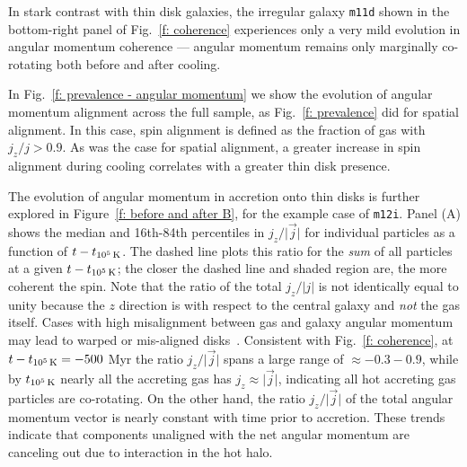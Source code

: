 \documentclass[fleqn,usenatbib]{mnras}
\newcommand{\tcon}{t_{10^5\,{\rm K}}}
\begin{document}
In stark contrast with thin disk galaxies, the irregular galaxy \texttt{m11d} shown in the bottom-right panel of Fig.~\ref{f: coherence} experiences only a very mild evolution in angular momentum coherence --- angular momentum remains only marginally co-rotating both before and after cooling.



In Fig.~\ref{f: prevalence - angular momentum} we show the evolution of angular momentum alignment across the full sample, as Fig.~\ref{f: prevalence} did for spatial alignment. 
In this case, spin alignment is defined as the fraction of gas with $j_z/j > 0.9$.
As was the case for spatial alignment, a greater increase in spin alignment during cooling correlates with a greater thin disk presence.

The evolution of angular momentum in accretion onto thin disks is further explored in Figure~\ref{f: before and after B}, for the example case of \texttt{m12i}.
Panel (A) shows the median and 16th-84th percentiles in $j_z/\vert\vec j\vert$ for individual particles as a function of $t-\tcon$.
The dashed line plots this ratio for the {\em sum} of all particles at a given $t-\tcon$; the closer the dashed line and shaded region are, the more coherent the spin.
Note that the ratio of the total $j_z/\vert j \vert$ is not identically equal to unity because the $z$ direction is with respect to the central galaxy and {\em not} the gas itself.
Cases with high misalignment between gas and galaxy angular momentum may lead to warped or mis-aligned disks~\citep[e.g.][]{Roskar2010, Starkenburg2019}.
Consistent with Fig.~\ref{f: coherence}, at $t-\tcon=-500$ Myr the ratio $j_z/\vert\vec j\vert$ spans a large range of $\approx -0.3 - 0.9$, while by $\tcon$ nearly all the accreting gas has $j_z\approx\vert\vec j\vert$, indicating all hot accreting gas particles are co-rotating.
On the other hand, the ratio $j_z/\vert\vec j\vert$ of the total angular momentum vector is nearly constant with time prior to accretion. 
These trends indicate that components unaligned with the net angular momentum are canceling out due to interaction in the hot halo.
\end{document}
